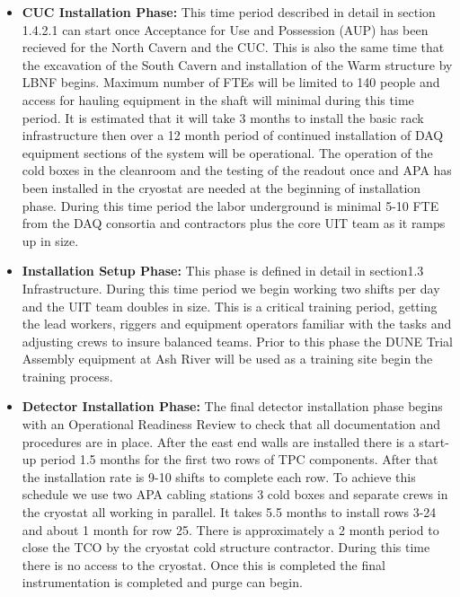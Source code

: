 \begin{itemize}
    \item {\bf CUC Installation Phase:}
    This time period described in detail in section 1.4.2.1 can start once Acceptance for Use and Possession (AUP) has been recieved for the North Cavern and the CUC. This is also the same time that the excavation of the South Cavern and installation of the Warm structure by LBNF begins. Maximum number of FTEs will be limited to 140 people and access for hauling equipment in the shaft will minimal during this time period.  It is estimated that it will take 3 months to install the basic rack infrastructure then over a 12 month period of continued installation of DAQ equipment sections of the system will be operational. The operation of the cold boxes in the cleanroom and the testing of the readout once and APA has been installed in the cryostat are needed at the beginning of installation phase. During this time period the labor underground is minimal 5-10 FTE from the DAQ consortia and contractors plus the core UIT team as it ramps up in size. 
    
    \item {\bf Installation Setup Phase:} This phase is defined in detail in section1.3 Infrastructure. During this time period we begin working two shifts per day and the UIT team doubles in size.  This is a critical training period, getting the lead workers, riggers and equipment operators familiar with the tasks and adjusting crews to insure balanced teams.  Prior to this phase the DUNE Trial Assembly equipment at Ash River will be used as a training site begin the training process.
    
    \item {\bf Detector Installation Phase:} The final detector installation phase begins with an Operational Readiness Review to check that all documentation and procedures are in place. After the east end walls are installed there is a start-up period 1.5 months for the first two rows of TPC components. After that the installation rate is 9-10 shifts to complete each row.  To achieve this schedule we use two APA cabling stations 3 cold boxes and separate crews in the cryostat all working in parallel.  It takes 5.5 months to install rows 3-24 and about 1 month for row 25. There is approximately a 2 month period to close the TCO by the cryostat cold structure contractor. During this time there is no access to the cryostat.  Once this is completed the final instrumentation is completed and purge can begin. 
    
\end{itemize}

